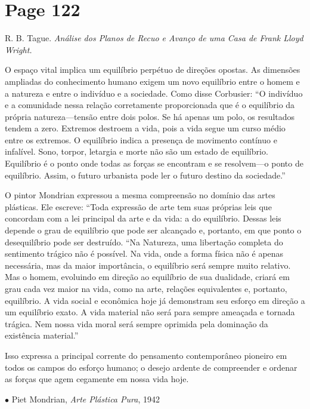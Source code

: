 \documentclass[a4paper]{article}
\begin{document}
\newpage
\section*{Page 122}

R. B. Tague. \textit{Análise dos Planos de Recuo e Avanço de uma Casa de Frank Lloyd Wright.}

O espaço vital implica um equilíbrio perpétuo de direções opostas. As dimensões ampliadas do conhecimento humano exigem um novo equilíbrio entre o homem e a natureza e entre o indivíduo e a sociedade. Como disse Corbusier: ``O indivíduo e a comunidade nessa relação corretamente proporcionada que é o equilíbrio da própria natureza---tensão entre dois polos. Se há apenas um polo, os resultados tendem a zero. Extremos destroem a vida, pois a vida segue um curso médio entre os extremos. O equilíbrio indica a presença de movimento contínuo e infalível. Sono, torpor, letargia e morte não são um estado de equilíbrio. Equilíbrio é o ponto onde todas as forças se encontram e se resolvem---o ponto de equilíbrio. Assim, o futuro urbanista pode ler o futuro destino da sociedade.''

O pintor Mondrian expressou a mesma compreensão no domínio das artes plásticas. Ele escreve:
``Toda expressão de arte tem suas próprias leis que concordam com a lei principal da arte e da vida: a do equilíbrio. Dessas leis depende o grau de equilíbrio que pode ser alcançado e, portanto, em que ponto o desequilíbrio pode ser destruído.
``Na Natureza, uma libertação completa do sentimento trágico não é possível. Na vida, onde a forma física não é apenas necessária, mas da maior importância, o equilíbrio será sempre muito relativo. Mas o homem, evoluindo em direção ao equilíbrio de sua dualidade, criará em grau cada vez maior na vida, como na arte, relações equivalentes e, portanto, equilíbrio. A vida social e econômica hoje já demonstram seu esforço em direção a um equilíbrio exato. A vida material não será para sempre ameaçada e tornada trágica. Nem nossa vida moral será sempre oprimida pela dominação da existência material.''

Isso expressa a principal corrente do pensamento contemporâneo pioneiro em todos os campos do esforço humano; o desejo ardente de compreender e ordenar as forças que agem cegamente em nossa vida hoje.

\begin{small}
$\bullet$ Piet Mondrian, \textit{Arte Plástica Pura}, 1942
\end{small}
\end{document}
